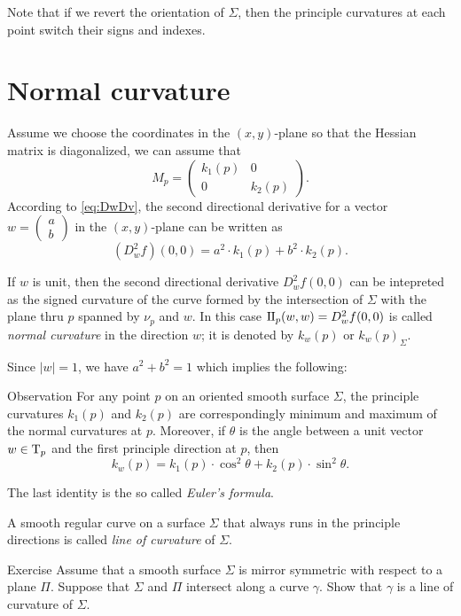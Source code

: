 Note that if we revert the orientation of $\Sigma$, then the principle curvatures at each point switch their signs and indexes.

\section*{Normal curvature}


Assume we choose the coordinates in the $(x,y)$-plane so that the Hessian matrix is diagonalized, we can assume that
\[M_p=\begin{pmatrix}
   k_1(p)
   &0
   \\
   0
   &k_2(p)
  \end{pmatrix}.
\]
According to \ref{eq:DwDv}, the second directional derivative
for a vector $w=(\begin{smallmatrix}a\\b
\end{smallmatrix})$ in the $(x,y)$-plane can be written as 
\[
(D^2_wf)(0,0)=a^2\cdot k_1(p) +b^2\cdot k_2(p).
\]

If $w$ is unit, then the second directional derivative $D^2_wf(0,0)$ can be intepreted as the signed curvature of the curve formed by the intersection of $\Sigma$ with the plane thru $p$ spanned by $\nu_p$ and $w$.
In this case $\mathrm{I}\hskip-.02em\mathrm{I}_p(w,w)=D^2_wf(0,0)$ is called \emph{normal curvature} in the direction $w$;
it is denoted by $k_w(p)$ or $k_w(p)_\Sigma$.

Since $|w|=1$, we have $a^2+b^2=1$ which implies the following:

\begin{thm}{Observation}\label{obs:k1-k2}
For any point $p$ on an oriented smooth surface $\Sigma$,
the principle curvatures $k_1(p)$ and $k_2(p)$ are correspondingly minimum and maximum of the normal curvatures at $p$.
Moreover, if $\theta$ is the angle between a unit vector $w\in\mathrm{T}_p$ and the first principle direction at $p$, then 
\[k_w(p)=k_1(p)\cdot\cos^2\theta+k_2(p)\cdot\sin^2\theta.\]

\end{thm}

The last identity is the so called \emph{Euler's formula}.

A smooth regular curve on a surface $\Sigma$ that always runs in the principle directions is called \emph{line of curvature} of $\Sigma$.  

\begin{thm}{Exercise}\label{ex:line-of-curvature}
Assume that a smooth surface $\Sigma$ is mirror symmetric with respect to  a plane $\Pi$.
Suppose that $\Sigma$ and $\Pi$ intersect along a curve $\gamma$.
Show that $\gamma$ is a line of curvature of $\Sigma$.
\end{thm}

